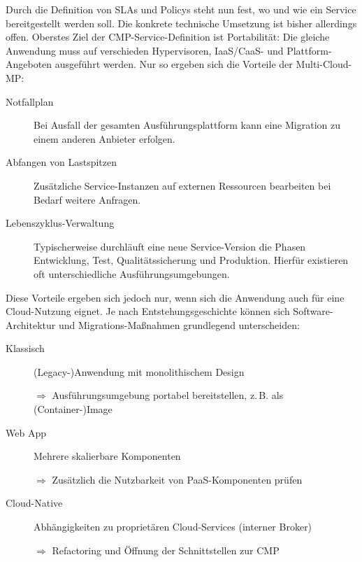 Durch die Definition von SLAs und Policys steht nun fest, wo und wie ein Service bereitgestellt werden soll. Die konkrete technische Umsetzung ist bisher allerdings offen. Oberstes Ziel der CMP-Service-Definition ist Portabilität: Die gleiche Anwendung muss auf verschieden Hypervisoren, IaaS/CaaS- und Plattform-Angeboten ausgeführt werden. Nur so ergeben sich die Vorteile der Multi-Cloud-MP:

\begin{description}
	
	\item[Notfallplan] Bei Ausfall der gesamten Ausführungsplattform kann eine Migration zu einem anderen Anbieter erfolgen.
	
	\item[Abfangen von Lastspitzen] Zusätzliche Service-Instanzen auf externen Ressourcen bearbeiten bei Bedarf weitere Anfragen.
	
	\item[Lebenszyklus-Verwaltung] Typischerweise durchläuft eine neue Service-Version die Phasen Entwicklung, Test, Qualitätssicherung und Produktion. Hierfür existieren oft unterschiedliche Ausführungsumgebungen.
	
\end{description}


\noindent
Diese Vorteile ergeben sich jedoch nur, wenn sich die Anwendung auch für eine Cloud-Nutzung eignet. Je nach Entstehungsgeschichte können sich Software-Architektur und Migrations-Maßnahmen grundlegend unterscheiden:

\begin{description}
	
	\item[Klassisch] (Legacy-)Anwendung mit monolithischem Design
	
	$\Rightarrow$ Ausführungsumgebung portabel bereitstellen, z.\,B. als (Container-)Image
	
	\item[Web App] Mehrere skalierbare Komponenten
	
	$\Rightarrow$ Zusätzlich die Nutzbarkeit von PaaS-Komponenten prüfen
	
	\item[Cloud-Native] Abhängigkeiten zu proprietären Cloud-Services (interner Broker)
	
	$\Rightarrow$ Refactoring und Öffnung der Schnittstellen zur CMP
	
\end{description}

